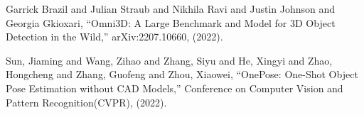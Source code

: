 \documentclass[a4j]{jarticle}
\begin{document}
\begin{thebibliography}{99}
Garrick Brazil and Julian Straub and Nikhila Ravi and Justin Johnson and Georgia Gkioxari, “Omni3D: A Large Benchmark and Model for {3D} Object Detection in the Wild,” arXiv:2207.10660, (2022).

Sun, Jiaming and Wang, Zihao and Zhang, Siyu and He, Xingyi and Zhao, Hongcheng and Zhang, Guofeng and Zhou, Xiaowei, “OnePose: One-Shot Object Pose Estimation without CAD Models,” Conference on Computer Vision and Pattern Recognition(CVPR), (2022).

\end{thebibliography}
\end{document}
